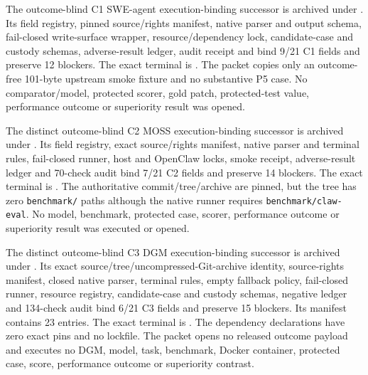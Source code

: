 The outcome-blind C1 SWE-agent execution-binding successor is archived under
. Its field
registry, pinned source/rights manifest, native parser and output schema,
fail-closed write-surface wrapper, resource/dependency lock, candidate-case and
custody schemas, adverse-result ledger, audit receipt and 
bind 9/21 C1 fields and preserve 12 blockers. The exact terminal is
.
The packet copies only an outcome-free 101-byte upstream smoke fixture and no
substantive P5 case. No comparator/model, protected scorer, gold patch,
protected-test value, performance outcome or superiority result was opened.

The distinct outcome-blind C2 MOSS execution-binding successor is archived
under . Its field
registry, exact source/rights manifest, native parser and terminal rules,
fail-closed runner, host and OpenClaw locks, smoke receipt, adverse-result
ledger and 70-check audit bind 7/21 C2 fields and preserve 14 blockers. The
exact terminal is
.
The authoritative commit/tree/archive are pinned, but the tree has zero
\texttt{benchmark/} paths although the native runner requires
\texttt{benchmark/claw-eval}. No model, benchmark, protected case, scorer,
performance outcome or superiority result was executed or opened.

The distinct outcome-blind C3 DGM execution-binding successor is archived
under . Its exact
source/tree/uncompressed-Git-archive identity, source-rights manifest, closed
native parser, terminal rules, empty fallback policy, fail-closed runner,
resource registry, candidate-case and custody schemas, negative ledger and
134-check audit bind 6/21 C3 fields and preserve 15 blockers. Its manifest
contains 23 entries. The exact terminal is
.
The dependency declarations have zero exact pins and no lockfile. The packet
opens no released outcome payload and executes no DGM, model, task, benchmark,
Docker container, protected case, score, performance outcome or superiority
contrast.

